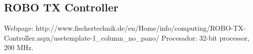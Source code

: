 
\subsection{ROBO TX Controller}
Webpage:
http://www.fischertechnik.de/en/Home/info/computing/ROBO-TX-Controller.aspx/usetemplate-1\_column\_no\_pano/
Procesador:
32-bit processor, 200 MHz.
